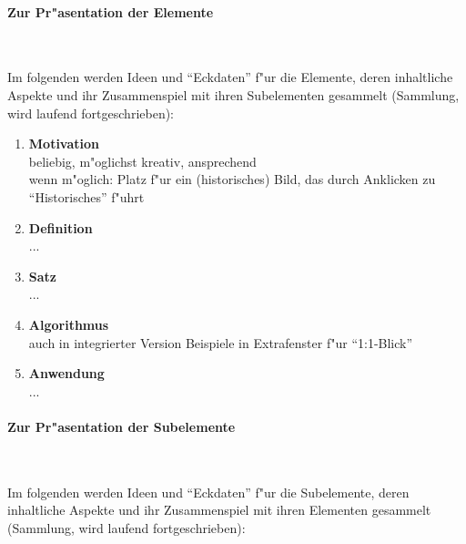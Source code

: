 \paragraph{Zur Pr"asentation der Elemente}

\mbox{ }
\vspace{0mm}

Im folgenden werden Ideen und ``Eckdaten'' f"ur die Elemente, deren
inhaltliche Aspekte und ihr Zusammenspiel mit ihren Subelementen
gesammelt (Sammlung, wird laufend fortgeschrieben):

\begin{enumerate}
        \item \textbf{Motivation}\\
	beliebig, m"oglichst kreativ, ansprechend\\
	wenn m"oglich: Platz f"ur ein (historisches) Bild, das durch
	Anklicken zu ``Historisches'' f"uhrt
	\item \textbf{Definition}\\
	...
	\item \textbf{Satz}\\
	...
	\item \textbf{Algorithmus}\\
	auch in integrierter Version Beispiele in Extrafenster f"ur ``1:1-Blick''
 	\item \textbf{Anwendung}\\
	...
\end{enumerate}


\paragraph{Zur Pr"asentation der Subelemente}

\mbox{ }
\vspace{0mm}

Im folgenden werden Ideen und ``Eckdaten'' f"ur die Subelemente, deren
inhaltliche Aspekte und ihr Zusammenspiel mit ihren Elementen
gesammelt (Sammlung, wird laufend fortgeschrieben):


